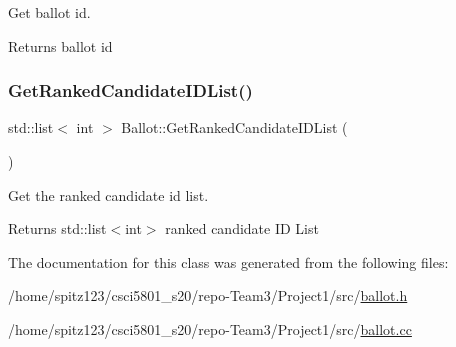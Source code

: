 Get ballot id. 

\begin{DoxyReturn}{Returns}
ballot id 
\end{DoxyReturn}
\mbox{\label{classBallot_a5107d9df309cc5b7ff4a237799e3bff5}} 
\subsubsection{\texorpdfstring{Get\+Ranked\+Candidate\+I\+D\+List()}{GetRankedCandidateIDList()}}
{\footnotesize\ttfamily std\+::list$<$ int $>$ Ballot\+::\+Get\+Ranked\+Candidate\+I\+D\+List (\begin{DoxyParamCaption}{ }\end{DoxyParamCaption})}



Get the ranked candidate id list. 

\begin{DoxyReturn}{Returns}
std\+::list$<$int$>$ ranked candidate ID List 
\end{DoxyReturn}


The documentation for this class was generated from the following files\+:\begin{DoxyCompactItemize}
\item 
/home/spitz123/csci5801\+\_\+s20/repo-\/\+Team3/\+Project1/src/\hyperlink{ballot_8h}{ballot.\+h}\item 
/home/spitz123/csci5801\+\_\+s20/repo-\/\+Team3/\+Project1/src/\hyperlink{ballot_8cc}{ballot.\+cc}\end{DoxyCompactItemize}
